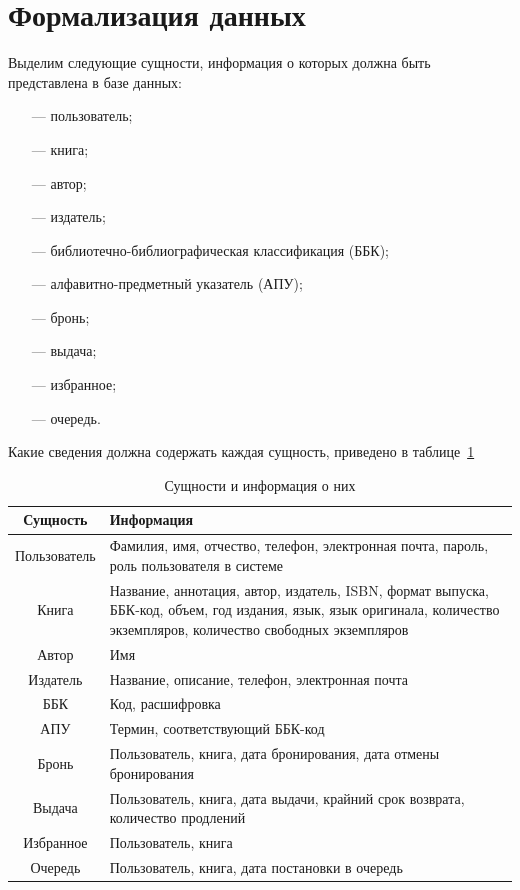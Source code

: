 \section{Формализация данных}
Выделим следующие сущности, информация о которых должна быть представлена в базе данных:
\begin{itemize}
    \item[---] пользователь;
    \item[---] книга;
    \item[---] автор;
    \item[---] издатель;
    \item[---] библиотечно-библиографическая классификация (ББК);
    \item[---] алфавитно-предметный указатель (АПУ);
    \item[---] бронь;
    \item[---] выдача;
    \item[---] избранное;
    \item[---] очередь.
\end{itemize}

Какие сведения должна содержать каждая сущность, приведено в таблице~\ref{tbl:entity}
\begin{table}[H]
    \begin{center}
        \caption{Сущности и информация о них}
        \begin{tabular}{|c|p{12cm}|}
            \hline
            \textbf{Сущность} & \textbf{Информация}\\
            \hline
            Пользователь &  Фамилия, имя, отчество, телефон, электронная почта, пароль, роль пользователя в системе\\
            \hline
            Книга & Название, аннотация, автор, издатель, ISBN, формат выпуска, ББК-код, объем, год издания, язык, язык оригинала, количество экземпляров, количество свободных экземпляров\\
            \hline
            Автор & Имя\\
            \hline
            Издатель & Название, описание, телефон, электронная почта\\
            \hline
            ББК & Код, расшифровка\\
            \hline
            АПУ & Термин, соответствующий ББК-код\\
            \hline
            Бронь & Пользователь, книга, дата бронирования, дата отмены бронирования\\
            \hline
            Выдача & Пользователь, книга, дата выдачи, крайний срок возврата, количество продлений\\
            \hline
            Избранное & Пользователь, книга\\
            \hline
            Очередь & Пользователь, книга, дата постановки в очередь\\
            \hline
        \end{tabular}
        \label{tbl:entity}
    \end{center}
\end{table}


